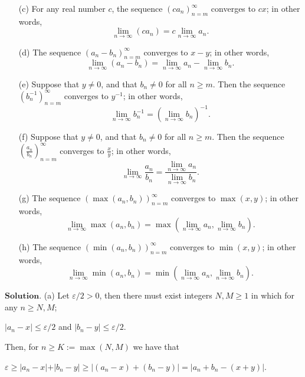 \documentclass{article}
\theoremstyle{remark}
\begin{document}
\begin{enumerate}
\begin{enumerate}
                \item[(c)] For any real number \( c \), the sequence \( (ca_n)_{n=m}^{\infty} \) converges to \( cx \); in other words,
                \[
                \lim_{n \to \infty} (ca_n) = c \lim_{n \to \infty} a_n.
                \]
                
                \item[(d)] The sequence \( (a_n - b_n)_{n=m}^{\infty} \) converges to \( x - y \); in other words,
                \[
                \lim_{n \to \infty} (a_n - b_n) = \lim_{n \to \infty} a_n - \lim_{n \to \infty} b_n.
                \]
            
                \item[(e)] Suppose that \( y \neq 0 \), and that \( b_n \neq 0 \) for all \( n \geq m \). Then the sequence \( (b_n^{-1})_{n=m}^{\infty} \) converges to \( y^{-1} \); in other words,
                \[
                \lim_{n \to \infty} b_n^{-1} = \left( \lim_{n \to \infty} b_n \right)^{-1}.
                \]
            
                \item[(f)] Suppose that \( y \neq 0 \), and that \( b_n \neq 0 \) for all \( n \geq m \). Then the sequence \( \left( \frac{a_n}{b_n} \right)_{n=m}^{\infty} \) converges to \( \frac{x}{y} \); in other words,
                \[
                \lim_{n \to \infty} \frac{a_n}{b_n} = \frac{\lim_{n \to \infty} a_n}{\lim_{n \to \infty} b_n}.
                \]
            
                \item[(g)] The sequence \( (\max(a_n, b_n))_{n=m}^{\infty} \) converges to \( \max(x, y) \); in other words,
                \[
                \lim_{n \to \infty} \max(a_n, b_n) = \max\left( \lim_{n \to \infty} a_n, \lim_{n \to \infty} b_n \right).
                \]
            
                \item[(h)] The sequence \( (\min(a_n, b_n))_{n=m}^{\infty} \) converges to \( \min(x, y) \); in other words,
                \[
                \lim_{n \to \infty} \min(a_n, b_n) = \min\left( \lim_{n \to \infty} a_n, \lim_{n \to \infty} b_n \right).
                \]
            \end{enumerate}
            $\textbf{Solution.}$
            (a) 
            Let $\varepsilon/2 > 0$, then there must exist integers $N, M \geq 1$ in which for any $n \geq N,M$;
            \begin{center}
                $\displaystyle \vert a_n - x \vert \leq \varepsilon/2$ and $\vert b_n - y \vert \leq \varepsilon/2$.
            \end{center}
            Then, for $n \geq K := \max(N,M)$ we have that 
            \begin{center}
                $\displaystyle \varepsilon \geq \vert a_n - x \vert + \vert b_n - y\vert \geq \vert (a_n - x) + (b_n - y)\vert = \vert a_n + b_n - (x + y)\vert$.
            \end{center}


\end{enumerate}
\end{document}
